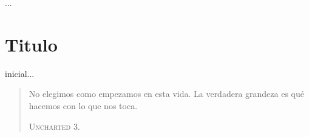 ...


\chapter*{Titulo} 

 inicial...

\begin{quote} \calli No elegimos como empezamos en esta vida. La verdadera grandeza es qué hacemos con lo que nos toca. 

\textsc{Uncharted 3.}
\end{quote}
